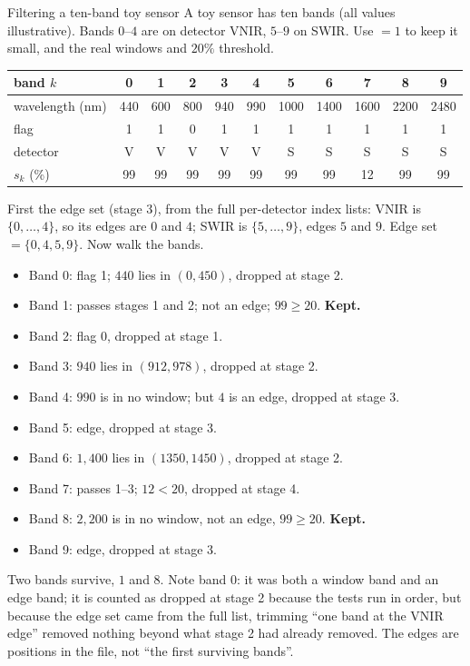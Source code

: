 \begin{worked}[label={we:bandpipeline:filter}]{Filtering a ten-band toy sensor}
A toy sensor has ten bands (all values illustrative\tagA). Bands $0$--$4$ are on detector VNIR,
$5$--$9$ on SWIR. Use  $= 1$ to keep it small, and the real windows and
$20\%$ threshold.
\begin{center}\small
\begin{tabular}{@{}lcccccccccc@{}}\toprule
band $k$ & 0 & 1 & 2 & 3 & 4 & 5 & 6 & 7 & 8 & 9\\\midrule
wavelength (nm) & 440 & 600 & 800 & 940 & 990 & 1000 & 1400 & 1600 & 2200 & 2480\\
flag & 1 & 1 & 0 & 1 & 1 & 1 & 1 & 1 & 1 & 1\\
detector & V & V & V & V & V & S & S & S & S & S\\
$s_k$ (\%) & 99 & 99 & 99 & 99 & 99 & 99 & 99 & 12 & 99 & 99\\\bottomrule
\end{tabular}
\end{center}
First the edge set (stage 3), from the full per-detector index lists: VNIR is $\{0,\dots,4\}$, so
its edges are $0$ and $4$; SWIR is $\{5,\dots,9\}$, edges $5$ and $9$. Edge set $= \{0, 4, 5, 9\}$.
Now walk the bands.
\begin{itemize}
\item Band 0: flag 1; $440$ lies in $(0, 450)$, dropped at stage 2.
\item Band 1: passes stages 1 and 2; not an edge; $99 \ge 20$. \textbf{Kept.}
\item Band 2: flag 0, dropped at stage 1.
\item Band 3: $940$ lies in $(912, 978)$, dropped at stage 2.
\item Band 4: $990$ is in no window; but $4$ is an edge, dropped at stage 3.
\item Band 5: edge, dropped at stage 3.
\item Band 6: $1{,}400$ lies in $(1350, 1450)$, dropped at stage 2.
\item Band 7: passes 1--3; $12 < 20$, dropped at stage 4.
\item Band 8: $2{,}200$ is in no window, not an edge, $99 \ge 20$. \textbf{Kept.}
\item Band 9: edge, dropped at stage 3.
\end{itemize}
Two bands survive, $1$ and $8$. Note band $0$: it was both a window band and an edge band; it
is counted as dropped at stage 2 because the tests run in order, but because the edge set came from
the full list, trimming ``one band at the VNIR edge'' removed nothing beyond what stage 2 had already
removed. The edges are positions in the file, not ``the first surviving bands''.
\end{worked}

